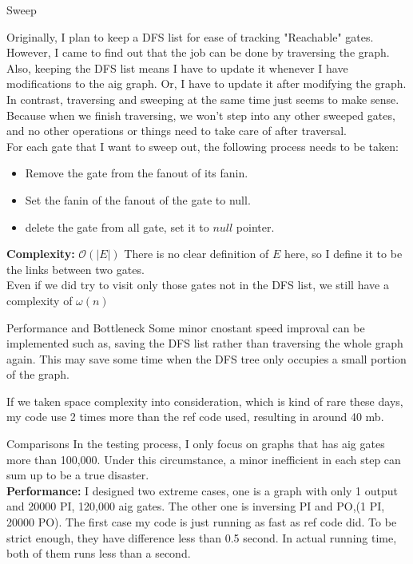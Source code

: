 \documentclass[12pt,a4paper]{report}
\begin{document}
\begin{section}{Sweep}

  Originally, I plan to keep a DFS list for ease of tracking "Reachable" gates. However,
  I came to find out that the job can be done by traversing the graph. Also, keeping the DFS list
  means I have to update it whenever I have modifications to the aig graph. Or, I have to
  update it after modifying the graph. In contrast, traversing and sweeping at the same time just seems to make sense.
  Because when we finish traversing, we won't step into any other sweeped gates, and no other operations or 
  things need to take care of after traversal.\\
  For each gate that I want to sweep out, the following process needs to be taken:
  \begin{itemize}
    \item Remove the gate from the fanout of its fanin.
    \item Set the fanin of the fanout of the gate to null.
    \item delete the gate from all gate, set it to $null$ pointer.
  \end{itemize}

  {\textbf{Complexity: }$\mathcal{O}(|E|)$} There is no clear definition of $E$ here, so I define
  it to be the links between two gates.\\
  
  Even if we did try to visit only those gates not in the DFS list, we still have a complexity of $\omega(n)$

\begin{subsection}{Performance and Bottleneck}
  Some minor cnostant speed improval can be implemented such as, saving the DFS list rather than 
  traversing the whole graph again. This may save some time when the DFS tree only occupies a 
  small portion of the graph.

  If we taken space complexity into consideration, which is kind of rare these days, my code use 2 times
  more than the ref code used, resulting in around 40 mb.
\end{subsection}
\begin{subsection}{Comparisons}
  In the testing process, I only focus on graphs that has aig gates more than 100,000. Under this
  circumstance, a minor inefficient in each step can sum up to be a true disaster.\\

\textbf{Performance: } I designed two extreme cases, one is a graph with only 1 output and 20000 PI, 120,000 aig gates.
The other one is inversing PI and PO,(1 PI, 20000 PO). The first case my code is just running as fast as ref code did.
To be strict enough, they have difference less than 0.5 second. In actual running time, both of them
runs less than a second.


\end{subsection}
\end{section}
\end{document}
